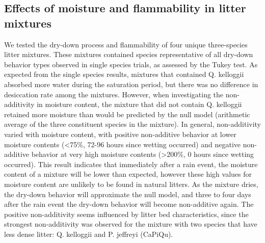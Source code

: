 \documentclass[fire,article,submit,moreauthors,pdftex]{Definitions/mdpi}
\begin{document}
\subsection{Effects of moisture and flammability in litter mixtures}

We tested the dry-down process and flammability of four unique three-species litter mixtures. These mixtures contained species representative of all dry-down behavior types observed in single species trials, as assessed by the Tukey test. As expected from the single species results, mixtures that contained Q. kelloggii absorbed more water during the saturation period, but there was no difference in desiccation rate among the mixtures. However, when investigating the non-additivity in moisture content, the mixture that did not contain Q. kelloggii retained more moisture than would be predicted by the null model (arithmetic average of the three constituent species in the mixture). In general, non-additivity varied with moisture content, with positive non-additive behavior at lower moisture contents (<75\%, 72-96 hours since wetting occurred) and negative non-additive behavior at very high moisture contents (>200\%, 0 hours since wetting occurred). This result indicates that immediately after a rain event, the moisture content of a mixture will be lower than expected, however these high values for moisture content are unlikely to be found in natural litters. As the mixture dries, the dry-down behavior will approximate the null model, and three to four days after the rain event the dry-down behavior will become non-additive again. The positive non-additivity seems influenced by litter bed characteristics, since the strongest non-additivity was observed for the mixture with two species that have less dense litter: Q. kelloggii and P. jeffreyi (CaPiQu).
\end{document}
